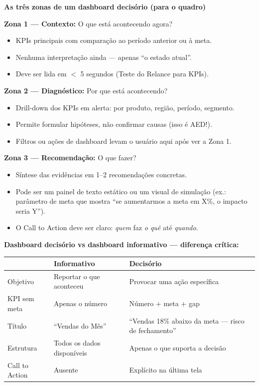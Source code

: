 \begin{BoardBox}
\textbf{As três zonas de um dashboard decisório (para o quadro)}

\textbf{Zona 1 — Contexto:} O que está acontecendo agora?
\begin{itemize}
  \item KPIs principais com comparação ao período anterior ou à meta.
  \item Nenhuma interpretação ainda — apenas ``o estado atual''.
  \item Deve ser lida em $<$ 5 segundos (Teste do Relance para KPIs).
\end{itemize}

\textbf{Zona 2 — Diagnóstico:} Por que está acontecendo?
\begin{itemize}
  \item Drill-down dos KPIs em alerta: por produto, região, período, segmento.
  \item Permite formular hipóteses, não confirmar causas (isso é AED!).
  \item Filtros ou ações de dashboard levam o usuário aqui após ver a Zona 1.
\end{itemize}

\textbf{Zona 3 — Recomendação:} O que fazer?
\begin{itemize}
  \item Síntese das evidências em 1–2 recomendações concretas.
  \item Pode ser um painel de texto estático ou um visual de simulação
  (ex.: parâmetro de meta que mostra ``se aumentarmos a meta em X\%, o impacto seria Y'').
  \item O Call to Action deve ser claro: \emph{quem} faz \emph{o quê} até \emph{quando}.
\end{itemize}
\end{BoardBox}

\begin{SolvedBox}
\textbf{Dashboard decisório vs dashboard informativo — diferença crítica:}

\begin{tabular}{|l|p{6cm}|p{5.5cm}|}
\hline
& \textbf{Informativo} & \textbf{Decisório} \\
\hline
Objetivo & Reportar o que aconteceu & Provocar uma ação específica \\
KPI sem meta & Apenas o número & Número + meta + gap \\
Título & ``Vendas do Mês'' & ``Vendas 18\% abaixo da meta — risco de fechamento'' \\
Estrutura & Todos os dados disponíveis & Apenas o que suporta a decisão \\
Call to Action & Ausente & Explícito na última tela \\
\hline
\end{tabular}
\end{SolvedBox}

